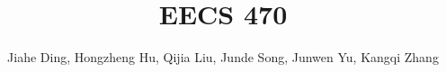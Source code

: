 \documentclass[conference]{IEEEtran}
\begin{document}
\title{EECS 470}

\author{Jiahe Ding, Hongzheng Hu, Qijia Liu, Junde Song, Junwen Yu, Kangqi Zhang
}

\maketitle
\end{document}
